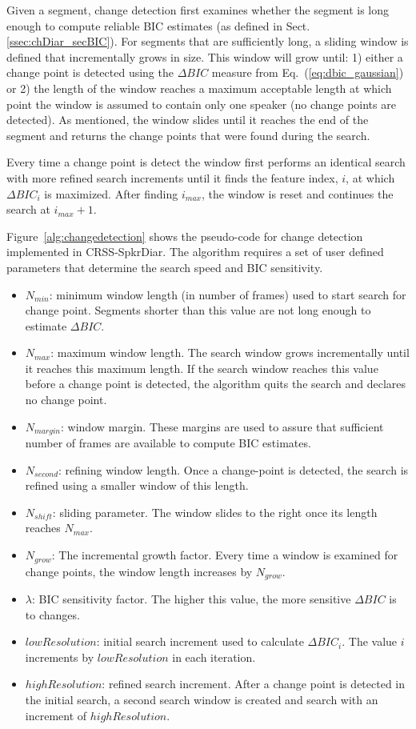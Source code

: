Given a segment, change detection first examines whether the segment is long enough to compute reliable BIC estimates (as defined in Sect.\ref{ssec:chDiar_secBIC}). 
For segments that are sufficiently long, a sliding window is defined that incrementally grows in size. 
This window will grow until: 1) either a change point is detected using the $\Delta BIC$ measure from Eq.~(\ref{eq:dbic_gaussian}) or 2) the length of the window reaches a maximum acceptable length at which point the window is assumed to contain only one speaker (no change points are detected). 
As mentioned, the window slides until it reaches the end of the segment and returns the change points that were found during the search. 

Every time a change point is detect the window first performs an identical search with more refined search increments until it finds the feature index, $i$, at which $\Delta BIC_i$ is maximized. 
After finding $i_{max}$, the window is reset and continues the search at $i_{max}+1$. 

Figure~\ref{alg:changedetection} shows the pseudo-code for change detection implemented in CRSS-SpkrDiar. 
The algorithm requires a set of user defined parameters that determine the search speed and BIC sensitivity. 
\begin{itemize}
	\item $N_{min}$: minimum window length (in number of frames) used to start search for change point. Segments shorter than this value are not long enough to estimate $\Delta BIC$. 
	\item $N_{max}$: maximum window length. The search window grows incrementally until it reaches this maximum length. If the search window reaches this value before a change point is detected, the algorithm quits the search and declares no change point. 
	\item $N_{margin}$: window margin. These margins are used to assure that sufficient number of frames are available to compute BIC estimates. 
	\item $N_{second}$: refining window length. Once a change-point is detected, the search is refined using a smaller window of this length. 
	\item $N_{shift}$: sliding parameter. The window slides to the right once its length reaches $N_{max}$. 
	\item $N_{grow}$: The incremental growth factor. Every time a window is examined for change points, the window length increases by $N_{grow}$.
	\item $\lambda$: BIC sensitivity factor. The higher this value, the more sensitive $\Delta BIC$ is to changes. 
	\item $lowResolution$: initial search increment used to calculate $\Delta BIC_i$. The value $i$ increments by $lowResolution$ in each iteration.
	\item $highResolution$: refined search increment. After a change point is detected in the initial search, a second search window is created and search with an increment of $highResolution$. 
\end{itemize}

